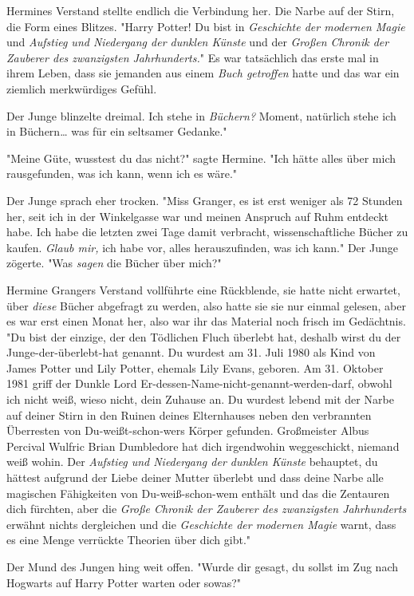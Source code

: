 {Hermines Verstand stellte endlich die Verbindung her. Die Narbe auf der Stirn, die Form eines Blitzes. "Harry Potter! Du bist in \emph{Geschichte der modernen Magie} und \emph{Aufstieg und Niedergang der dunklen Künste} und der \emph{Großen Chronik der Zauberer des zwanzigsten Jahrhunderts.}" Es war tatsächlich das erste mal in ihrem Leben, dass sie jemanden aus einem \emph{Buch getroffen} hatte und das war ein ziemlich merkwürdiges Gefühl.

Der Junge blinzelte dreimal. Ich stehe in \emph{Büchern?} Moment, natürlich stehe ich in Büchern… was für ein seltsamer Gedanke."

"Meine Güte, wusstest du das nicht?" sagte Hermine. "Ich hätte alles über mich rausgefunden, was ich kann, wenn ich es wäre."

Der Junge sprach eher trocken. "Miss Granger, es ist erst weniger als 72 Stunden her, seit ich in der Winkelgasse war und meinen Anspruch auf Ruhm entdeckt habe. Ich habe die letzten zwei Tage damit verbracht, wissenschaftliche Bücher zu kaufen. \emph{Glaub mir,} ich habe vor, alles herauszufinden, was ich kann." Der Junge zögerte. "Was \emph{sagen} die Bücher über mich?"

Hermine Grangers Verstand vollführte eine Rückblende, sie hatte nicht erwartet, über \emph{diese} Bücher abgefragt zu werden, also hatte sie sie nur einmal gelesen, aber es war erst einen Monat her, also war ihr das Material noch frisch im Gedächtnis. "Du bist der einzige, der den Tödlichen Fluch überlebt hat, deshalb wirst du der Junge-der-überlebt-hat genannt. Du wurdest am 31. Juli 1980 als Kind von James Potter und Lily Potter, ehemals Lily Evans, geboren. Am 31. Oktober 1981 griff der Dunkle Lord Er-dessen-Name-nicht-genannt-werden-darf, obwohl ich nicht weiß, wieso nicht, dein Zuhause an. Du wurdest lebend mit der Narbe auf deiner Stirn in den Ruinen deines Elternhauses neben den verbrannten Überresten von Du-weißt-schon-wers Körper gefunden. Großmeister Albus Percival Wulfric Brian Dumbledore hat dich irgendwohin weggeschickt, niemand weiß wohin. Der \emph{Aufstieg und Niedergang der dunklen Künste} behauptet, du hättest aufgrund der Liebe deiner Mutter überlebt und dass deine Narbe alle magischen Fähigkeiten von Du-weiß-schon-wem enthält und das die Zentauren dich fürchten, aber die \emph{Große Chronik der Zauberer des zwanzigsten Jahrhunderts} erwähnt nichts dergleichen und die \emph{Geschichte der modernen Magie} warnt, dass es eine Menge verrückte Theorien über dich gibt."

Der Mund des Jungen hing weit offen. "Wurde dir gesagt, du sollst im Zug nach Hogwarts auf Harry Potter warten oder sowas?"

}
